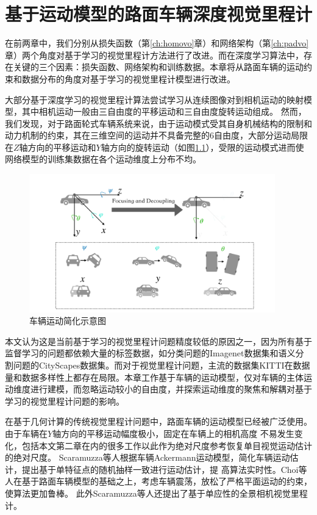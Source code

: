 \chapter{基于运动模型的路面车辆深度视觉里程计}
\label{ch:datavo}
在前两章中，我们分别从损失函数（第\ref{ch:homovo}章）和网络架构（第\ref{ch:padvo}章）两个角度对基于学习的视觉里程计方法进行了改进。而在深度学习算法中，存在关键的三个因素：损失函数、网络架构和训练数据。本章将从路面车辆的运动约束和数据分布的角度对基于学习的视觉里程计模型进行改进。

大部分基于深度学习的视觉里程计算法尝试学习从连续图像对到相机运动的映射模型，其中相机运动一般由三自由度的平移运动和三自由度旋转运动组成。
然而，我们发现，对于路面轮式车辆系统来说，由于运动模式受其自身机械结构的限制和动力机制的约束，其在三维空间的运动并不具备完整的6自由度，大部分运动局限在$Z$轴方向的平移运动和$Y$轴方向的旋转运动（如图\ref{fig:car_simplify}），受限的运动模式进而使网络模型的训练集数据在各个运动维度上分布不均。
\begin{figure}[h]
    \centering
    \includegraphics[width=0.95\textwidth]{datavo/car_simplify.pdf}
    \caption{车辆运动简化示意图}
    \label{fig:car_simplify}
\end{figure}
本文认为这是当前基于学习的视觉里程计问题精度较低的原因之一，因为所有基于监督学习的问题都依赖大量的标签数据，如分类问题的Imagenet数据集\cite{deng2009imagenet}和语义分割问题的CityScapes数据集\cite{Cordts2016Cityscapes}。而对于视觉里程计问题，主流的数据集KITTI\cite{geiger2012kitti}在数据量和数据多样性上都存在局限。本章工作基于车辆的运动模型，仅对车辆的主体运动维度进行建模，而忽略运动较小的自由度，并探索运动维度的聚焦和解耦对基于学习的视觉里程计问题的影响。

在基于几何计算的传统视觉里程计问题中，路面车辆的运动模型已经被广泛使用。由于车辆在$Y$轴方向的平移运动幅度极小，固定在车辆上的相机高度
不易发生变化，包括本文第二章在内的很多工作\cite{Song2015MoncularScale,Lee2015MoncularScale,zhou2016reliable,7898840}以此作为绝对尺度参考恢复单目视觉运动估计的绝对尺度。
Scaramuzza等人\cite{scaramuzza2009real}根据车辆Ackermann运动模型，简化车辆运动估计，提出基于单特征点的随机抽样一致进行运动估计，提
高算法实时性。Choi等人\cite{choi2015simplified}在基于路面车辆模型的基础之上，考虑车辆震荡，放松了严格平面运动的约束，使算法更加鲁棒。
此外Scaramuzza等人\cite{4625958}还提出了基于单应性的全景相机视觉里程计。


